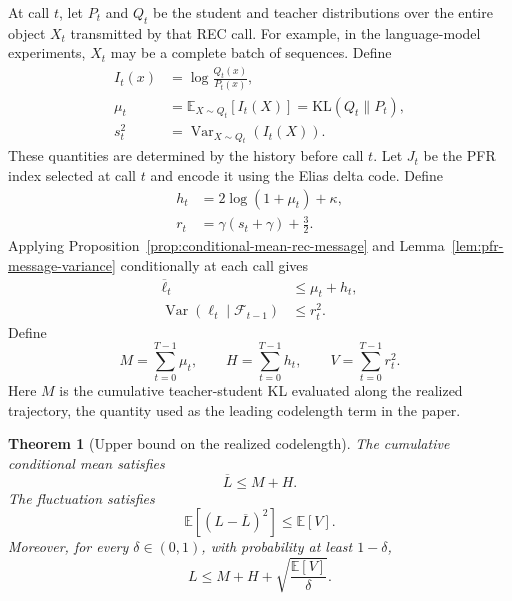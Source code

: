 \documentclass{article}
\theoremstyle{plain}
\newtheorem{theorem}{Theorem}[section]
\theoremstyle{definition}
\theoremstyle{remark}
\begin{document}
At call $t$, let $P_t$ and $Q_t$ be the student and teacher distributions over the entire object $X_t$ transmitted by that REC call. For example, in the language-model experiments, $X_t$ may be a complete batch of sequences. Define
\begin{align}
    I_t(x)
    &=
    \log\frac{Q_t(x)}{P_t(x)},
    \\
    \mu_t
    &=
    \mathbb E_{X\sim Q_t}[I_t(X)]
    =
    \mathrm{KL}(Q_t\|P_t),
    \\
    s_t^2
    &=
    \operatorname{Var}_{X\sim Q_t}(I_t(X)).
    \label{eq:call-level-mu-s}
\end{align}
These quantities are determined by the history before call $t$. Let $J_t$ be the PFR index selected at call $t$ and encode it using the Elias delta code. Define
\begin{align}
    h_t
    &=
    2\log(1+\mu_t)
    +\kappa,
    \\
    r_t
    &=
    \gamma(s_t+\gamma)
    +\frac{3}{2}.
    \label{eq:trajectory-terms}
\end{align}
Applying Proposition~\ref{prop:conditional-mean-rec-message} and Lemma~\ref{lem:pfr-message-variance} conditionally at each call gives
\begin{align}
    \overline\ell_t
    &\leq
    \mu_t+h_t,
    \label{eq:conditional-message-mean-upper}
    \\
    \operatorname{Var}(\ell_t\mid\mathcal F_{t-1})
    &\leq
    r_t^2.
    \label{eq:conditional-message-variance}
\end{align}
Define
\begin{equation}
    M
    =
    \sum_{t=0}^{T-1}\mu_t,
    \qquad
    H
    =
    \sum_{t=0}^{T-1}h_t,
    \qquad
    V
    =
    \sum_{t=0}^{T-1}r_t^2.
    \label{eq:cumulative-terms}
\end{equation}
Here $M$ is the cumulative teacher-student KL evaluated along the realized trajectory, the quantity used as the leading codelength term in the paper.

\begin{theorem}[Upper bound on the realized codelength]
\label{thm:realized-codelength-upper}
The cumulative conditional mean satisfies
\begin{equation}
    \overline L
    \leq
    M+H.
    \label{eq:conditional-cumulative-mean-upper}
\end{equation}
The fluctuation satisfies
\begin{equation}
    \mathbb E\left[
      (L-\overline L)^2
    \right]
    \leq
    \mathbb E[V].
    \label{eq:cumulative-fluctuation-upper}
\end{equation}
Moreover, for every $\delta\in(0,1)$, with probability at least $1-\delta$,
\begin{equation}
    L
    \leq
    M+H
    +
    \sqrt{\frac{\mathbb E[V]}{\delta}}.
    \label{eq:realized-codelength-upper}
\end{equation}
\end{theorem}
\end{document}

